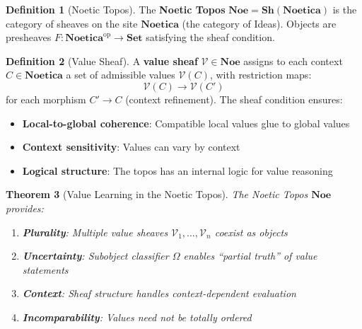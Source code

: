 \documentclass[11pt,twoside]{article}
\theoremstyle{definition}
\newtheorem{definition}{Definition}[section]
\theoremstyle{plain}
\newtheorem{theorem}[definition]{Theorem}
\theoremstyle{remark}
\newcommand{\Noetica}{\mathbf{Noetica}}
\newcommand{\Sh}{\mathbf{Sh}}
\newcommand{\NoeticTopos}{\mathbf{Noe}}
\begin{document}
\begin{definition}[Noetic Topos]
\label{def:noetic-topos}
The \textbf{Noetic Topos} $\NoeticTopos = \Sh(\Noetica)$ is the category of sheaves on the
site $\Noetica$ (the category of Ideas). Objects are presheaves $F : \Noetica^{\mathrm{op}} \to
\mathbf{Set}$ satisfying the sheaf condition.
\end{definition}

\begin{definition}[Value Sheaf]
\label{def:value-sheaf}
A \textbf{value sheaf} $\mathcal{V} \in \NoeticTopos$ assigns to each context $C \in \Noetica$
a set of admissible values $\mathcal{V}(C)$, with restriction maps:
\[
\mathcal{V}(C) \to \mathcal{V}(C')
\]
for each morphism $C' \to C$ (context refinement). The sheaf condition ensures:
\begin{itemize}
  \item \textbf{Local-to-global coherence}: Compatible local values glue to global values
  \item \textbf{Context sensitivity}: Values can vary by context
  \item \textbf{Logical structure}: The topos has an internal logic for value reasoning
\end{itemize}
\end{definition}

\begin{theorem}[Value Learning in the Noetic Topos]
\label{thm:value-topos}
The Noetic Topos $\NoeticTopos$ provides:
\begin{enumerate}
  \item \textbf{Plurality}: Multiple value sheaves $\mathcal{V}_1, \ldots, \mathcal{V}_n$
        coexist as objects
  \item \textbf{Uncertainty}: Subobject classifier $\Omega$ enables ``partial truth''
        of value statements
  \item \textbf{Context}: Sheaf structure handles context-dependent evaluation
  \item \textbf{Incomparability}: Values need not be totally ordered
\end{enumerate}
\end{theorem}
\end{document}
